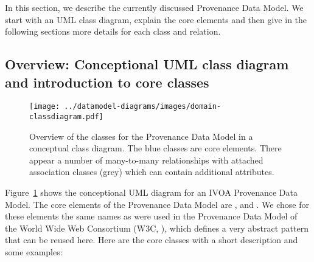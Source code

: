 % 
In this section, we describe the currently discussed Provenance Data Model. We 
start with an UML class diagram, explain the core elements and then give 
in the following sections more details for each class and relation.

\subsection{Overview: Conceptional UML class diagram and introduction to core classes}

\begin{figure}[h]
\centering
\texttt{[image: ../datamodel-diagrams/images/domain-classdiagram.pdf]}
\caption{Overview of the classes for the Provenance Data Model in a conceptual class diagram. The blue classes are core elements. There appear a number of many-to-many relationships with attached association classes (grey) which can contain additional attributes.}
\label{fig:classdiagram-conceptional}
\end{figure}



Figure~\ref{fig:classdiagram-conceptional} shows the conceptional UML diagram for an IVOA Provenance Data
Model.
The core elements of the Provenance Data Model are ,  and . 
We chose for these elements the same names as were used in the Provenance Data 
Model of the World Wide Web Consortium (W3C, \citealt{std:W3CProvDM}), which defines 
a very abstract pattern that can be reused here. Here are the core classes with 
a short description and some examples:


